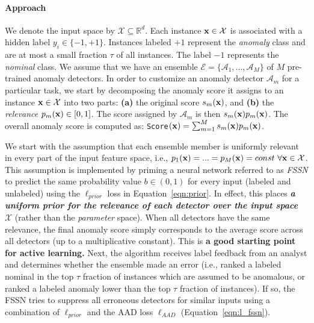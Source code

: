 \documentclass{article}
\begin{document}
\paragraph{Approach} We denote the input space by $\mathcal{X} \subseteq \mathbb{R}^d$. Each instance ${\bf x} \in \mathcal{X}$ is associated with a hidden label $y_i \in \{-1, +1\}$. Instances labeled $+1$ represent the \textit{anomaly} class and are at most a small fraction $\tau$ of all instances. The label $-1$ represents the \textit{nominal} class. We assume that we have an ensemble $\mathcal{E} = \{\mathcal{A}_1, ..., \mathcal{A}_M\}$ of $M$ pre-trained anomaly detectors. In order to customize an anomaly detector $\mathcal{A}_m$ for a particular task, we start by decomposing the anomaly score it assigns to an instance ${\bf x} \in \mathcal{X}$ into two parts: {\bf (a)} the original score $s_m({\bf x})$, and {\bf (b)} the \textit{relevance} $p_m({\bf x}) \in [0, 1]$. The score assigned by $\mathcal{A}_m$ is then $s_m({\bf x})p_m({\bf x})$. The overall anomaly score is computed as: \texttt{Score}$({\bf x}) = \sum_{m=1}^M{s_m({\bf x})p_m({\bf x})}$.

We start with the assumption that each ensemble member is uniformly relevant in every part of the input feature space, i.e., $p_1({\bf x}) = ... = p_M({\bf x}) = const \ \forall {\bf x} \in \mathcal{X}$. This assumption is implemented by priming a neural network referred to as \textit{FSSN} to predict the same probability value $b \in (0, 1)$ for every input (labeled and unlabeled) using the $\ell_{prior}$ loss in Equation~\ref{eqn:prior}. In effect, this places \textit{\textbf{a uniform prior for the relevance of each detector over the input space $\mathcal{X}$}}  (rather than the {\em parameter} space). When all detectors have the same relevance, the final anomaly score simply corresponds to the average score across all detectors (up to a multiplicative constant). This is \textbf{a good starting point for active learning.} Next, the algorithm receives label feedback from an analyst and determines whether the ensemble made an error (i.e., ranked a labeled nominal in the top $\tau$ fraction of instances which are assumed to be anomalous, or ranked a labeled anomaly lower than the top $\tau$ fraction of instances). If so, the FSSN tries to suppress all erroneous detectors for similar inputs using a combination of $\ell_{prior}$ and the AAD loss $\ell_{AAD}$ (Equation~\ref{eqn:l_fssn}).
\end{document}
